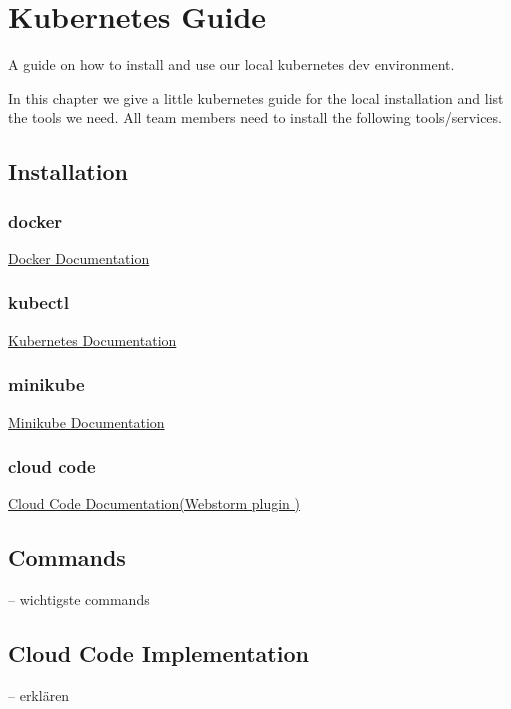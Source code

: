 \chapter{Kubernetes Guide}
A guide on how to install and use our local kubernetes dev environment.

In this chapter we give a little kubernetes guide for the local installation and list the tools we need. All team members need to install the following tools/services.

\section{Installation}
\subsection{docker}
\href{https://docs.docker.com/get-docker/}{Docker Documentation}

\subsection{kubectl}
\href{https://kubernetes.io/docs/tasks/tools/#kubectl}{Kubernetes Documentation}

\subsection{minikube}
\href{https://minikube.sigs.k8s.io/docs/start/}{Minikube Documentation}

\subsection{cloud code}
\href{https://plugins.jetbrains.com/plugin/8079-cloud-code/}{Cloud Code Documentation(Webstorm plugin
)}

\section{Commands}
-- wichtigste commands

\section{Cloud Code Implementation}
-- erklären
